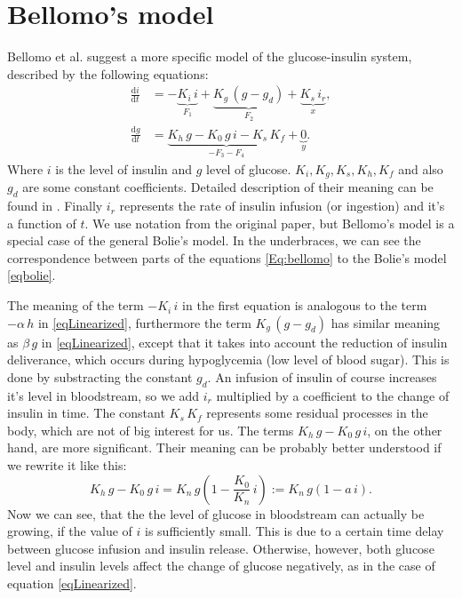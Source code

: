 \documentclass{article}
\providecommand{\m}[1]{\ensuremath{\mathrm{#1}}}
\begin{document}
\section{Bellomo's model}
Bellomo et al. \cite{bellomo} suggest a more specific model of the glucose-insulin system, described by the following equations:
\begin{equation}
\label{Eq:bellomo}
\begin{aligned}
 \frac{\m{d}i}{\m{d}t} &= -\underbrace{K_i\,i}_{F_1} + \underbrace{K_g\,(g - g_d)}_{F_2} + \underbrace{K_s\,i_r}_{x}, \\
 \frac{\m{d}g}{\m{d}t} &= \underbrace{K_h\,g - K_0\,g\,i - K_s\,K_f}_{-F_3-F_4} + \underbrace{0}_{y}.
\end{aligned}
\end{equation}
Where $i$ is the level of insulin and $g$ level of glucose.
$K_i, K_g, K_s, K_h, K_f$ and also $g_d$ are some constant coefficients.
Detailed description of their meaning can be found in \cite{bellomo}.
Finally $i_r$ represents the rate of insulin infusion (or ingestion) and it's a function of $t$.
We use notation from the original paper, but Bellomo's model is a special case of the general Bolie's model.
In the underbraces, we can see the correspondence between parts of the equations \eqref{Eq:bellomo} to the Bolie's model \eqref{eqbolie}.

The meaning of the term $-K_i\,i$ in the first equation is analogous to the term $-\alpha\,h$ in \eqref{eqLinearized},
furthermore the term $K_g\,(g - g_d)$ has similar meaning as $\beta\,g$ in \eqref{eqLinearized},
except that it takes into account the reduction of insulin deliverance, which occurs during hypoglycemia 
(low level of blood sugar). This is done by substracting the constant $g_d$.
An infusion of insulin of course increases it's level in bloodstream, so we add $i_r$ multiplied by a coefficient
to the change of insulin in time. The constant $K_s\,K_f$ represents some residual processes in the body,
which are not of big interest for us. The terms $K_h\,g - K_0\,g\,i$, on the other hand,
are more significant. Their meaning can be probably better understood if we rewrite it like this:
\[ K_h\,g - K_0\,g\,i = K_n\,g\left(1 - \frac{K_0}{K_n}\,i\right) := K_n\,g(1 - a\,i). \]
Now we can see, that the the level of glucose in bloodstream can actually be growing, if
the value of $i$ is sufficiently small.
This is due to a certain time delay between glucose infusion and insulin release.
Otherwise, however, both glucose level and insulin levels affect the change of glucose negatively,
as in the case of equation \eqref{eqLinearized}.
\end{document}
